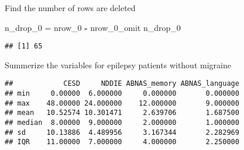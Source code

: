 \documentclass[]{article}
\newenvironment{Shaded}{\begin{snugshade}}{\end{snugshade}}
\newcommand{\KeywordTok}[1]{\textcolor[rgb]{0.13,0.29,0.53}{\textbf{#1}}}
\newcommand{\DataTypeTok}[1]{\textcolor[rgb]{0.13,0.29,0.53}{#1}}
\newcommand{\DecValTok}[1]{\textcolor[rgb]{0.00,0.00,0.81}{#1}}
\newcommand{\StringTok}[1]{\textcolor[rgb]{0.31,0.60,0.02}{#1}}
\newcommand{\OperatorTok}[1]{\textcolor[rgb]{0.81,0.36,0.00}{\textbf{#1}}}
\newcommand{\NormalTok}[1]{#1}
\begin{document}
Find the number of rows are deleted

\begin{Shaded}
\begin{Highlighting}[]
\NormalTok{n_drop_}\DecValTok{0}\NormalTok{ =}\StringTok{ }\NormalTok{nrow_}\DecValTok{0} \OperatorTok{-}\StringTok{ }\NormalTok{nrow_0_omit}
\NormalTok{n_drop_}\DecValTok{0}
\end{Highlighting}
\end{Shaded}

\begin{verbatim}
## [1] 65
\end{verbatim}

Summerize the variables for epilepsy patients without migraine

\begin{Shaded}
\end{Shaded}

\begin{verbatim}
##            CESD     NDDIE ABNAS_memory ABNAS_language
## min     0.00000  6.000000     0.000000       0.000000
## max    48.00000 24.000000    12.000000       9.000000
## mean   10.52574 10.301471     2.639706       1.687500
## median  8.00000  9.000000     2.000000       1.000000
## sd     10.13886  4.489956     3.167344       2.282969
## IQR    11.00000  7.000000     4.000000       2.250000
\end{verbatim}
\end{document}
